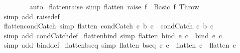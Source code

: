 \begin{isabellebody}
\isanewline
\ \ \ \ \isamarkupfalse%
\isanewline
\ \ \isamarkupfalse%
\isanewline
{}\isamarkupfalse%
\ {\isacharparenleft}auto{\isacharparenright}%
\endisatagproof
{\isafoldproof}%
%
\isadelimproof
\isanewline
%
\endisadelimproof
\isanewline
{}\isamarkupfalse%
\ flatten{\isacharunderscore}raise\ {\isacharbrackleft}simp{\isacharbrackright}{\isacharcolon}\ {\isachardoublequoteopen}flatten\ {\isacharparenleft}raise\ f{\isacharparenright}\ {\isacharequal}\ {\isacharbrackleft}Basic\ f{\isacharcomma}\ Throw{\isacharbrackright}{\isachardoublequoteclose}\isanewline
%
\isadelimproof
\ \ %
\endisadelimproof
%
\isatagproof
{}\isamarkupfalse%
\ {\isacharparenleft}simp\ add{\isacharcolon}\ raise{\isacharunderscore}def{\isacharparenright}%
\endisatagproof
{\isafoldproof}%
%
\isadelimproof
\isanewline
%
\endisadelimproof
\isanewline
{}\isamarkupfalse%
\ flatten{\isacharunderscore}condCatch\ {\isacharbrackleft}simp{\isacharbrackright}{\isacharcolon}\ {\isachardoublequoteopen}flatten\ {\isacharparenleft}condCatch\ c{}\ b\ c{}{\isacharparenright}\ {\isacharequal}\ {\isacharbrackleft}condCatch\ c{}\ b\ c{}{\isacharbrackright}{\isachardoublequoteclose}\isanewline
%
\isadelimproof
\ \ %
\endisadelimproof
%
\isatagproof
{}\isamarkupfalse%
\ {\isacharparenleft}simp\ add{\isacharcolon}\ condCatch{\isacharunderscore}def{\isacharparenright}%
\endisatagproof
{\isafoldproof}%
%
\isadelimproof
\isanewline
%
\endisadelimproof
\isanewline
{}\isamarkupfalse%
\ flatten{\isacharunderscore}bind\ {\isacharbrackleft}simp{\isacharbrackright}{\isacharcolon}\ {\isachardoublequoteopen}flatten\ {\isacharparenleft}bind\ e\ c{\isacharparenright}\ {\isacharequal}\ {\isacharbrackleft}bind\ e\ c{\isacharbrackright}{\isachardoublequoteclose}\isanewline
%
\isadelimproof
\ \ %
\endisadelimproof
%
\isatagproof
{}\isamarkupfalse%
\ {\isacharparenleft}simp\ add{\isacharcolon}\ bind{\isacharunderscore}def{\isacharparenright}%
\endisatagproof
{\isafoldproof}%
%
\isadelimproof
\isanewline
%
\endisadelimproof
\isanewline
{}\isamarkupfalse%
\ flatten{\isacharunderscore}bseq\ {\isacharbrackleft}simp{\isacharbrackright}{\isacharcolon}\ {\isachardoublequoteopen}flatten\ {\isacharparenleft}bseq\ c{}\ c{}{\isacharparenright}\ {\isacharequal}\ flatten\ c{}\ {\isacharat}\ flatten\ c{}{\isachardoublequoteclose}\isanewline
%
\isadelimproof
\ \ %
\endisadelimproof
%
\isatagproof
{}\isamarkupfalse%

\end{isabellebody}
